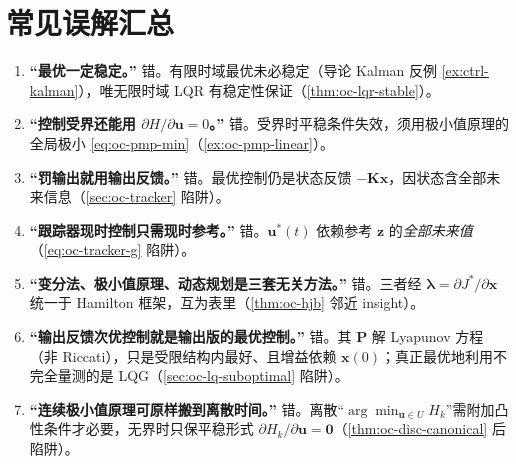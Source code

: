 \section*{常见误解汇总}
\begin{enumerate}
  \item \textbf{“最优一定稳定。”}\; 错。有限时域最优未必稳定（导论 Kalman 反例 \cref{ex:ctrl-kalman}），唯无限时域 LQR 有稳定性保证（\cref{thm:oc-lqr-stable}）。
  \item \textbf{“控制受界还能用 $\partial H/\partial\mathbf u=0$。”}\; 错。受界时平稳条件失效，须用极小值原理的全局极小 \cref{eq:oc-pmp-min}（\cref{ex:oc-pmp-linear}）。
  \item \textbf{“罚输出就用输出反馈。”}\; 错。最优控制仍是状态反馈 $-\mathbf K\mathbf x$，因状态含全部未来信息（\cref{sec:oc-tracker} 陷阱）。
  \item \textbf{“跟踪器现时控制只需现时参考。”}\; 错。$\mathbf u^*(t)$ 依赖参考 $\mathbf z$ 的\emph{全部未来值}（\cref{eq:oc-tracker-g} 陷阱）。
  \item \textbf{“变分法、极小值原理、动态规划是三套无关方法。”}\; 错。三者经 $\boldsymbol\lambda=\partial J^*/\partial\mathbf x$ 统一于 Hamilton 框架，互为表里（\cref{thm:oc-hjb} 邻近 insight）。
  \item \textbf{“输出反馈次优控制就是输出版的最优控制。”}\; 错。其 $\mathbf P$ 解 Lyapunov 方程（非 Riccati），只是受限结构内最好、且增益依赖 $\mathbf x(0)$；真正最优地利用不完全量测的是 LQG（\cref{sec:oc-lq-suboptimal} 陷阱）。
  \item \textbf{“连续极小值原理可原样搬到离散时间。”}\; 错。离散“$\arg\min_{\mathbf u\in U}H_k$”需附加凸性条件才必要，无界时只保平稳形式 $\partial H_k/\partial\mathbf u=\mathbf0$（\cref{thm:oc-disc-canonical} 后陷阱）。
\end{enumerate}

